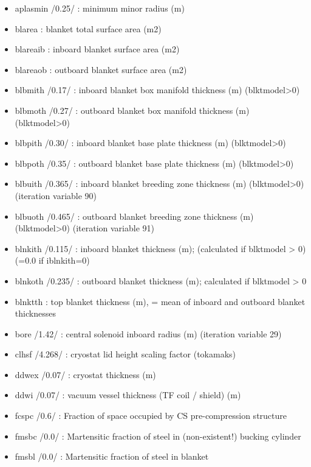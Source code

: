 \documentclass[]{article}
\providecommand{\tightlist}{%
  \setlength{\itemsep}{0pt}\setlength{\parskip}{0pt}}
\begin{document}
\begin{itemize}
  \begin{itemize}
  \tightlist
  \item
    aplasmin /0.25/ : minimum minor radius (m)
  \item
    blarea : blanket total surface area (m2)
  \item
    blareaib : inboard blanket surface area (m2)
  \item
    blareaob : outboard blanket surface area (m2)
  \item
    blbmith /0.17/ : inboard blanket box manifold thickness (m)
    (blktmodel\textgreater{}0)
  \item
    blbmoth /0.27/ : outboard blanket box manifold thickness (m)
    (blktmodel\textgreater{}0)
  \item
    blbpith /0.30/ : inboard blanket base plate thickness (m)
    (blktmodel\textgreater{}0)
  \item
    blbpoth /0.35/ : outboard blanket base plate thickness (m)
    (blktmodel\textgreater{}0)
  \item
    blbuith /0.365/ : inboard blanket breeding zone thickness (m)
    (blktmodel\textgreater{}0) (iteration variable 90)
  \item
    blbuoth /0.465/ : outboard blanket breeding zone thickness (m)
    (blktmodel\textgreater{}0) (iteration variable 91)
  \item
    blnkith /0.115/ : inboard blanket thickness (m); (calculated if
    blktmodel \textgreater{} 0) (=0.0 if iblnkith=0)
  \item
    blnkoth /0.235/ : outboard blanket thickness (m); calculated if
    blktmodel \textgreater{} 0
  \item
    blnktth : top blanket thickness (m), = mean of inboard and outboard
    blanket thicknesses
  \item
    bore /1.42/ : central solenoid inboard radius (m) (iteration
    variable 29)
  \item
    clhsf /4.268/ : cryostat lid height scaling factor (tokamaks)
  \item
    ddwex /0.07/ : cryostat thickness (m)
  \item
    ddwi /0.07/ : vacuum vessel thickness (TF coil / shield) (m)
  \item
    fcspc /0.6/ : Fraction of space occupied by CS pre-compression
    structure
  \item
    fmsbc /0.0/ : Martensitic fraction of steel in (non-existent!)
    bucking cylinder
  \item
    fmsbl /0.0/ : Martensitic fraction of steel in blanket

\end{itemize}
\end{itemize}
\end{document}
